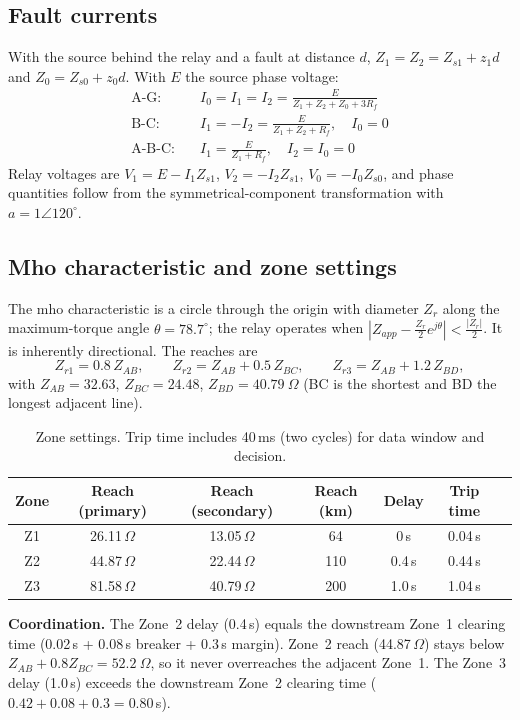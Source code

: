 \documentclass[11pt,a4paper]{article}
\begin{document}
\subsection{Fault currents}
With the source behind the relay and a fault at distance $d$, $Z_1=Z_2=Z_{s1}+z_1 d$ and $Z_0=Z_{s0}+z_0 d$. With $E$ the source phase voltage:
\begin{align*}
\text{A-G:}&\quad I_0=I_1=I_2=\frac{E}{Z_1+Z_2+Z_0+3R_f}\\
\text{B-C:}&\quad I_1=-I_2=\frac{E}{Z_1+Z_2+R_f},\quad I_0=0\\
\text{A-B-C:}&\quad I_1=\frac{E}{Z_1+R_f},\quad I_2=I_0=0
\end{align*}
Relay voltages are $V_1=E-I_1Z_{s1}$, $V_2=-I_2Z_{s1}$, $V_0=-I_0Z_{s0}$, and phase quantities follow from the symmetrical-component transformation with $a=1\angle120^\circ$.

\subsection{Mho characteristic and zone settings}
The mho characteristic is a circle through the origin with diameter $Z_r$ along the maximum-torque angle $\theta=78.7^\circ$; the relay operates when $|Z_{app}-\tfrac{Z_r}{2}e^{j\theta}|<\tfrac{|Z_r|}{2}$. It is inherently directional. The reaches are
\[
Z_{r1}=0.8\,Z_{AB},\qquad Z_{r2}=Z_{AB}+0.5\,Z_{BC},\qquad Z_{r3}=Z_{AB}+1.2\,Z_{BD},
\]
with $Z_{AB}=32.63$, $Z_{BC}=24.48$, $Z_{BD}=40.79~\Omega$ (BC is the shortest and BD the longest adjacent line).
\begin{table}[H]\centering\small
\begin{tabular}{ccccccc}\toprule
Zone & Reach (primary) & Reach (secondary) & Reach (km) & Delay & Trip time\\\midrule
Z1 & 26.11\,$\Omega$ & 13.05\,$\Omega$ & 64  & 0\,s   & 0.04\,s\\
Z2 & 44.87\,$\Omega$ & 22.44\,$\Omega$ & 110 & 0.4\,s & 0.44\,s\\
Z3 & 81.58\,$\Omega$ & 40.79\,$\Omega$ & 200 & 1.0\,s & 1.04\,s\\\bottomrule
\end{tabular}
\caption{Zone settings. Trip time includes 40\,ms (two cycles) for data window and decision.}
\end{table}
\textbf{Coordination.} The Zone~2 delay (0.4\,s) equals the downstream Zone~1 clearing time (0.02\,s + 0.08\,s breaker + 0.3\,s margin). Zone~2 reach (44.87\,$\Omega$) stays below $Z_{AB}+0.8Z_{BC}=52.2~\Omega$, so it never overreaches the adjacent Zone~1. The Zone~3 delay (1.0\,s) exceeds the downstream Zone~2 clearing time ($0.42+0.08+0.3=0.80$\,s).
\end{document}
